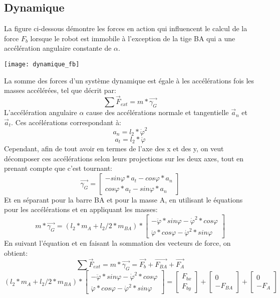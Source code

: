 \documentclass{udes_rapport} %
\begin{document}
\subsection{Dynamique}
La figure ci-dessous démontre les forces en action qui influencent le calcul de la force $F_b$ lorsque le robot est immobile à l'exception de la tige BA qui a une accélération angulaire constante de $\alpha$.
\begin{center}
	\centering
	\texttt{[image: dynamique\_fb]}
	\label{dynamique_fb}
\end{center}
La somme des forces d'un système dynamique est égale à les accélérations fois les masses accélérées, tel que décrit par:
\begin{equation}
	\sum \overrightarrow F_{ext} = m*\overrightarrow {\gamma_G}
\end{equation}
L'accélération angulaire $\alpha$ cause des accélérations normale et tangentielle $\overrightarrow a_n$ et $\overrightarrow a_t$. Ces accélérations correspondant à:
\begin{equation}
	 a_n = l_2 * \dot{\varphi}^{2}
\end{equation}
\begin{equation}
	 a_t = l_2 * \ddot{\varphi}
\end{equation}
Cependant, afin de tout avoir en termes de l'axe des x et des y, on veut décomposer ces accélérations selon leurs projections sur les deux axes, tout en prenant compte que c'est tournant:
	\[	\overrightarrow {\gamma_G} = \begin{bmatrix}
	-sin\varphi*a_t-cos\varphi*a_n\\
	cos\varphi*a_t-sin\varphi*a_n
	\end{bmatrix}	\]
Et en séparant pour la barre BA et pour la masse A, en utilisant le équations pour les accélérations et en appliquant les masses:
	\[	m * \overrightarrow {\gamma_G} = (l_2*m_A + l_2/2*m_{BA}) * \begin{bmatrix}
	-\ddot{\varphi}*sin\varphi-\dot{\varphi}^{2}*cos\varphi\\
	\ddot{\varphi}*cos\varphi-\dot{\varphi}^{2}*sin\varphi
	\end{bmatrix}	\]
En suivant l'équation et en faisant la sommation des vecteurs de force, on obtient:
	\[	\sum \overrightarrow F_{ext} = m * \overrightarrow {\gamma_G} =  \overrightarrow{F_b} + \overrightarrow{F_{BA}} + \overrightarrow{F_A}	\]
	\[	(l_2*m_A + l_2/2*m_{BA}) * \begin{bmatrix}
	-\ddot{\varphi}*sin\varphi-\dot{\varphi}^{2}*cos\varphi\\
	\ddot{\varphi}*cos\varphi-\dot{\varphi}^{2}*sin\varphi
	\end{bmatrix} = \begin{bmatrix}
	F_{bx}\\ 
	F_{by}
	\end{bmatrix} + \begin{bmatrix}
	0\\ 
	-F_{BA}
	\end{bmatrix} + \begin{bmatrix}
	0\\ 
	-F_A
	\end{bmatrix}	\]
\end{document}
